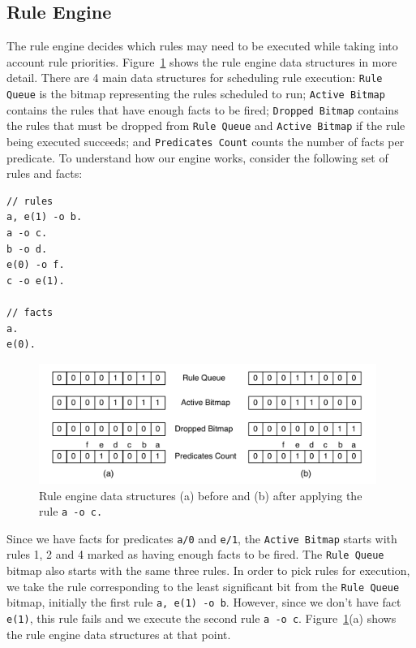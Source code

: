 \subsection{Rule Engine}
\label{rule_engine}

The rule engine decides which rules may need to be executed while
taking into account rule priorities. Figure~\ref{fig:rule_engine}
shows the rule engine data structures in more detail. There are 4 main
data structures for scheduling rule execution: \texttt{Rule Queue} is
the bitmap representing the rules scheduled to run; \texttt{Active
Bitmap} contains the rules that have enough facts to be
fired; \texttt{Dropped Bitmap} contains the rules that must be dropped
from \texttt{Rule Queue} and \texttt{Active Bitmap} if the rule being
executed succeeds; and \texttt{Predicates Count} counts the number of
facts per predicate. To understand how our engine works, consider the
following set of rules and facts:

{\footnotesize
\begin{Verbatim}
// rules
a, e(1) -o b.
a -o c.
b -o d.
e(0) -o f.
c -o e(1).

// facts
a.
e(0).
\end{Verbatim}
}

\begin{figure}[t]
\centering
\includegraphics[width=11cm]{figures/rule_queue.pdf}
\caption{Rule engine data structures (a) before and (b) after applying 
  the rule \texttt{a -o c.}}
\label{fig:rule_engine}
\end{figure}

Since we have facts for predicates \texttt{a/0} and \texttt{e/1},
the \texttt{Active Bitmap} starts with rules 1, 2 and 4 marked as
having enough facts to be fired. The \texttt{Rule Queue} bitmap also
starts with the same three rules. In order to pick rules for
execution, we take the rule corresponding to the least significant bit
from the \texttt{Rule Queue} bitmap, initially the first
rule \texttt{a, e(1) -o b}. However, since we don't have
fact \texttt{e(1)}, this rule fails and we execute the second
rule \texttt{a -o c}. Figure~\ref{fig:rule_engine}(a) shows the rule
engine data structures at that point.


